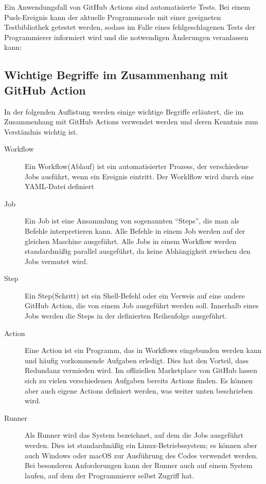 Ein Anwendungsfall von GitHub Actions sind automatisierte Tests. Bei einem Push-Ereignis kann der aktuelle Programmcode mit einer geeigneten Testbibliothek getestet werden, sodass im Falle eines fehlgeschlagenen Tests der Programmierer informiert wird und die notwendigen Änderungen veranlassen kann: 

\subsection{Wichtige Begriffe im Zusammenhang mit GitHub Action}
In der folgenden Auflistung werden einige wichtige Begriffe erläutert, die im Zusammenhang mit GitHub Actions verwendet werden und deren Kenntnis zum Verständnis wichtig ist. 
\begin{description}
    \item[Workflow] Ein Workflow(Ablauf) ist ein automatisierter Prozess, der verschiedene Jobs ausführt, wenn ein Ereignis eintritt. Der Worklflow wird durch eine YAML-Datei definiert
    \item[Job] Ein Job ist eine Ansammlung von sogenannten \enquote{Steps}, die man als Befehle interpretieren kann. Alle Befehle in einem Job werden auf der gleichen Maschine ausgeführt. Alle Jobs in einem Workflow werden standardmäßig parallel ausgeführt, da keine Abhängigkeit zwischen den Jobs vermutet wird.
    \item[Step] Ein Step(Schritt) ist ein Shell-Befehl oder ein Verweis auf eine andere GitHub Action, die von einem Job ausgeführt werden soll. Innerhalb eines Jobs werden die Steps in der definierten Reihenfolge ausgeführt. 
    \item[Action] Eine Action ist ein Programm, das in Workflows eingebunden werden kann und häufig vorkommende Aufgaben erledigt. Dies hat den Vorteil, dass Redundanz vermieden wird. Im offiziellen Marketplace von GitHub lassen sich zu vielen verschiedenen Aufgaben bereits Actions finden. Es können aber auch eigene Actions definiert werden, was weiter unten beschrieben wird. 
    \item[Runner] Als Runner wird das System bezeichnet, auf dem die Jobs ausgeführt werden. Dies ist standardmäßig ein Linux-Betriebssystem; es können aber auch Windows oder macOS zur Ausführung des Codes verwendet werden. Bei besonderen Anforderungen kann der Runner auch auf einem System laufen, auf dem der Programmierer selbst Zugriff hat.
\end{description}
